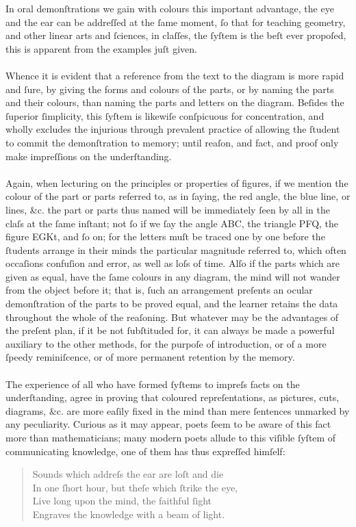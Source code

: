 In oral demonſtrations we gain with colours this important advantage, the eye and the ear can be addreſſed at the ſame moment, ſo that for teaching geometry, and other linear arts and ſciences, in claſſes, the ſyſtem is the beſt ever propoſed, this is apparent from the examples juſt given.\\
\hfill\\
Whence it is evident that a reference from the text to the diagram is more rapid and ſure, by giving the forms and colours of the parts, or by naming the parts and their colours, than naming the parts and letters on the diagram. Beſides the ſuperior ſimplicity, this ſyſtem is likewiſe conſpicuous for concentration, and wholly excludes the injurious through prevalent practice of allowing the ſtudent to commit the demonſtration to memory; until reaſon, and fact, and proof only make impreſſions on the underſtanding.\\
\hfill\\
Again, when lecturing on the principles or properties of figures, if we mention the colour of the part or parts referred to, as in ſaying, the red angle, the blue line, or lines, \&c. the part or parts thus named will be immediately ſeen by all in the claſs at the ſame inſtant; not ſo if we ſay the angle ABC, the triangle PFQ, the figure EGKt, and ſo on; for the letters muſt be traced one by one before the ſtudents arrange in their minds the particular magnitude referred to, which often occaſions confuſion and error, as well as loſs of time.  Alſo if the parts which are given as equal, have the ſame colours in any diagram, the mind will not wander from the object before it; that is, ſuch an arrangement preſents an ocular demonſtration of the parts to be proved equal, and the learner retains the data throughout the whole of the reaſoning.  But whatever may be the advantages of the preſent plan, if it be not ſubſtituded for, it can always be made a powerful auxiliary to the other methods, for the purpoſe of introduction, or of a more ſpeedy reminiſcence, or of more permanent retention by the memory.\\
\hfill\\
The experience of all who have formed ſyſtems to impreſs facts on the underſtanding, agree in proving that coloured repreſentations, as pictures, cuts, diagrams, \&c. are more eaſily fixed in the mind than mere ſentences unmarked by any peculiarity. Curious as it may appear, poets ſeem to be aware of this fact more than mathematicians; many modern poets allude to this viſible ſyſtem of communicating knowledge, one of them has thus expreſſed himſelf:
\begin{quotation}
    \small{\noindent Sounds which addreſs the ear are loſt and die\\
        In one ſhort hour, but theſe which ſtrike the eye,\\
        Live long upon the mind, the faithful ſight\\
        Engraves the knowledge with a beam of light.}
\end{quotation}

